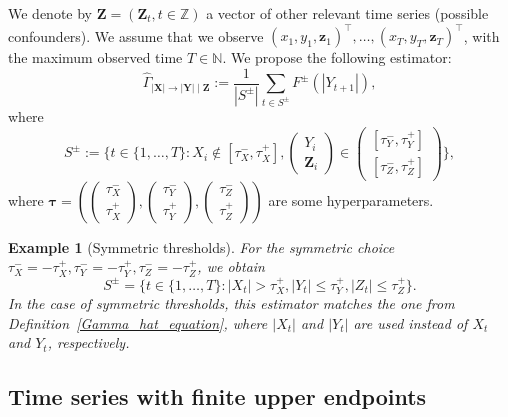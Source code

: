 \documentclass[a4paper,11pt]{article}
\newtheorem*{example*}{Example}
\begin{document}
We denote by  $\textbf{Z} = (\textbf{Z}_t, t\in\mathbb{Z})$ a vector of other relevant time series (possible confounders).  We assume that we observe $(x_1, y_1, \textbf{z}_1)^\top, \dots, (x_T, y_T, \textbf{z}_T)^\top$, with the maximum observed time $T\in\mathbb{N}$. We propose the following estimator:
 \begin{equation*}
\hat{\Gamma}_{|\textbf{X}|\to|\textbf{Y}|\mid \textbf{Z} }:=  \frac{1}{|S^{\pm}|}\sum_{t\in S^{\pm}}  
F^{\pm}(|Y_{t+1}|),
  \end{equation*}
 where
   \begin{equation*}
      S^{\pm} := \{t\in\{1, \dots, T\}: X_i\not\in [\tau_{X}^{-}, \tau_{X}^{+}], 
\begin{pmatrix}
    Y_i \\
    \textbf{Z}_i 
\end{pmatrix}  \in \begin{pmatrix}
   [\tau_{Y}^{-}, \tau_{Y}^{+}] \\
   [\tau_{Z}^{-}, \tau_{Z}^{+}]
\end{pmatrix}
\},
  \end{equation*}
 where $\boldsymbol{\tau} = ( \begin{pmatrix}
   \tau_{X}^{-} \\
   \tau_{X}^{+}
\end{pmatrix},
\begin{pmatrix}
   \tau_{Y}^{-} \\
   \tau_{Y}^{+}
\end{pmatrix},
\begin{pmatrix}
   \tau_{Z}^{-} \\
   \tau_{Z}^{+}
\end{pmatrix})$ are some hyperparameters.

\begin{example*}[Symmetric thresholds]
    For the symmetric choice $ \tau_{X}^{-} =- \tau_{X}^{+}, \tau_{Y}^{-} =- \tau_{Y}^{+}, \tau_{Z}^{-} =- \tau_{Z}^{+}$, we obtain 
   \begin{equation*}
      S^{\pm} = \{t\in\{1, \dots, T\}: |X_t|> \tau_{X}^{+},  |Y_t|\leq  \tau_{Y}^{+},|Z_t|\leq  \tau_{Z}^{+} \}. 
  \end{equation*}
In the case of symmetric thresholds, this estimator matches the one from Definition~\ref{Gamma_hat_equation}, where \(|X_t|\) and \(|Y_t|\) are used instead of \(X_t\) and \(Y_t\), respectively.
\end{example*}



\subsection{Time series with finite upper endpoints}
\label{Appendix_A_support}
\end{document}
